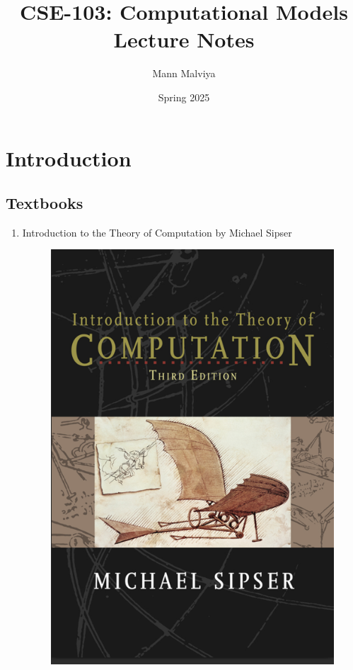 \documentclass{article}
\title{CSE-103: Computational Models\\ Lecture Notes}
\author{Mann Malviya}
\date{Spring 2025}
\begin{document}
\maketitle
\tableofcontents
\newpage

\section*{Introduction}


\subsection*{Textbooks}

\begin{enumerate}
    \item Introduction to the Theory of Computation by Michael Sipser
    \begin{figure}[H]
        \centering
        \includegraphics[scale=2]{103_TB.png}
        \caption*{}
    \end{figure}
\end{enumerate}
\end{document}
